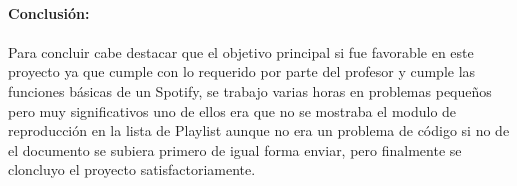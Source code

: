 \documentclass[40pt]{article}
\begin{document}
\maketitle
\textsf{\ \\
\textbf{Conclusión:}
\\
\\
Para concluir cabe destacar que el objetivo principal si fue favorable en este proyecto ya que cumple con lo requerido por parte del profesor y cumple las funciones básicas de un Spotify, se trabajo varias horas en problemas pequeños pero muy significativos uno de ellos era que no se mostraba el modulo de reproducción en la lista de Playlist aunque no era un problema de código si no de el documento se subiera primero de igual forma enviar, pero finalmente se cloncluyo el proyecto satisfactoriamente.
\\}
\end{document}
